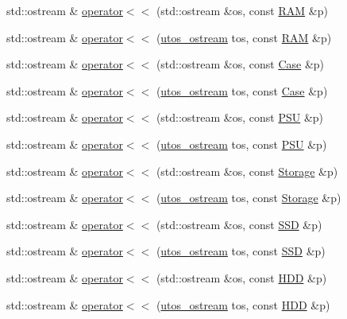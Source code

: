 \begin{DoxyCompactItemize}
\item 
std\+::ostream \& \mbox{\hyperlink{_parts_8cpp_a6fdebbd47f8bac238a905dc2cc26f16d}{operator$<$$<$}} (std\+::ostream \&os, const \mbox{\hyperlink{class_r_a_m}{R\+AM}} \&p)
\item 
std\+::ostream \& \mbox{\hyperlink{_parts_8cpp_a9c26b4bc6e7ef6ecfc579c223a3ba7b8}{operator$<$$<$}} (\mbox{\hyperlink{structutos__ostream}{utos\+\_\+ostream}} tos, const \mbox{\hyperlink{class_r_a_m}{R\+AM}} \&p)
\item 
std\+::ostream \& \mbox{\hyperlink{_parts_8cpp_a65c2ee003aa5edc6bbaf4c4c18df4166}{operator$<$$<$}} (std\+::ostream \&os, const \mbox{\hyperlink{class_case}{Case}} \&p)
\item 
std\+::ostream \& \mbox{\hyperlink{_parts_8cpp_a77cdcd9f79b67b63f1b1e12759d2bee0}{operator$<$$<$}} (\mbox{\hyperlink{structutos__ostream}{utos\+\_\+ostream}} tos, const \mbox{\hyperlink{class_case}{Case}} \&p)
\item 
std\+::ostream \& \mbox{\hyperlink{_parts_8cpp_aa5927379449df3d8bbc27e025c5d148f}{operator$<$$<$}} (std\+::ostream \&os, const \mbox{\hyperlink{class_p_s_u}{P\+SU}} \&p)
\item 
std\+::ostream \& \mbox{\hyperlink{_parts_8cpp_a4ba52014f911426a8b686e368603f396}{operator$<$$<$}} (\mbox{\hyperlink{structutos__ostream}{utos\+\_\+ostream}} tos, const \mbox{\hyperlink{class_p_s_u}{P\+SU}} \&p)
\item 
std\+::ostream \& \mbox{\hyperlink{_parts_8cpp_a83138f021cbea0af0a56c70cdb1e0454}{operator$<$$<$}} (std\+::ostream \&os, const \mbox{\hyperlink{class_storage}{Storage}} \&p)
\item 
std\+::ostream \& \mbox{\hyperlink{_parts_8cpp_a0d1b0d887a5d979d6059c644bbf6801b}{operator$<$$<$}} (\mbox{\hyperlink{structutos__ostream}{utos\+\_\+ostream}} tos, const \mbox{\hyperlink{class_storage}{Storage}} \&p)
\item 
std\+::ostream \& \mbox{\hyperlink{_parts_8cpp_ac6bdcededa1d9e3fdb9bf9e48a5eff40}{operator$<$$<$}} (std\+::ostream \&os, const \mbox{\hyperlink{class_s_s_d}{S\+SD}} \&p)
\item 
std\+::ostream \& \mbox{\hyperlink{_parts_8cpp_a08d554261caa1fb75148667904a77ad3}{operator$<$$<$}} (\mbox{\hyperlink{structutos__ostream}{utos\+\_\+ostream}} tos, const \mbox{\hyperlink{class_s_s_d}{S\+SD}} \&p)
\item 
std\+::ostream \& \mbox{\hyperlink{_parts_8cpp_ab32c05e13dae5fcc5abde983898567ef}{operator$<$$<$}} (std\+::ostream \&os, const \mbox{\hyperlink{class_h_d_d}{H\+DD}} \&p)
\item 
std\+::ostream \& \mbox{\hyperlink{_parts_8cpp_a59d777ba1e3bc0c9c209fb084ce91aa3}{operator$<$$<$}} (\mbox{\hyperlink{structutos__ostream}{utos\+\_\+ostream}} tos, const \mbox{\hyperlink{class_h_d_d}{H\+DD}} \&p)
\end{DoxyCompactItemize}


